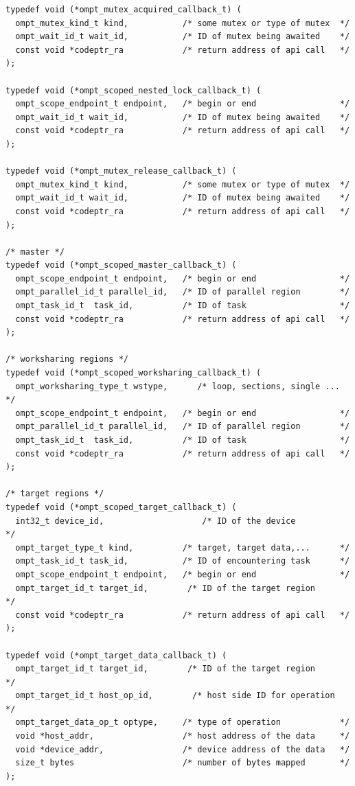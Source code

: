 \documentclass{article}
\begin{document}
{\begin{verbatim}
typedef void (*ompt_mutex_acquired_callback_t) ( 
  ompt_mutex_kind_t kind,           /* some mutex or type of mutex  */ 
  ompt_wait_id_t wait_id,           /* ID of mutex being awaited    */
  const void *codeptr_ra            /* return address of api call   */          
);

typedef void (*ompt_scoped_nested_lock_callback_t) ( 
  ompt_scope_endpoint_t endpoint,   /* begin or end                 */ 
  ompt_wait_id_t wait_id,           /* ID of mutex being awaited    */
  const void *codeptr_ra            /* return address of api call   */          
);

typedef void (*ompt_mutex_release_callback_t) ( 
  ompt_mutex_kind_t kind,           /* some mutex or type of mutex  */
  ompt_wait_id_t wait_id,           /* ID of mutex being awaited    */
  const void *codeptr_ra            /* return address of api call   */       
);

/* master */
typedef void (*ompt_scoped_master_callback_t) ( 
  ompt_scope_endpoint_t endpoint,   /* begin or end                 */ 			   
  ompt_parallel_id_t parallel_id,   /* ID of parallel region        */
  ompt_task_id_t  task_id,          /* ID of task                   */
  const void *codeptr_ra            /* return address of api call   */
);

/* worksharing regions */								    
typedef void (*ompt_scoped_worksharing_callback_t) (
  ompt_worksharing_type_t wstype,	   /* loop, sections, single ...   */	
  ompt_scope_endpoint_t endpoint,   /* begin or end                 */ 		   
  ompt_parallel_id_t parallel_id,   /* ID of parallel region        */
  ompt_task_id_t  task_id,          /* ID of task                   */
  const void *codeptr_ra            /* return address of api call   */
);							    

/* target regions */
typedef void (*ompt_scoped_target_callback_t) ( 
  int32_t device_id,                    /* ID of the device             */
  ompt_target_type_t kind,          /* target, target data,...      */
  ompt_task_id_t task_id,           /* ID of encountering task      */     
  ompt_scope_endpoint_t endpoint,   /* begin or end                 */ 
  ompt_target_id_t target_id, 	     /* ID of the target region      */
  const void *codeptr_ra            /* return address of api call   */
);

typedef void (*ompt_target_data_callback_t) (
  ompt_target_id_t target_id, 	     /* ID of the target region      */
  ompt_target_id_t host_op_id,	      /* host side ID for operation   */
  ompt_target_data_op_t optype,     /* type of operation            */
  void *host_addr,                  /* host address of the data     */
  void *device_addr,                /* device address of the data   */ 
  size_t bytes                      /* number of bytes mapped       */		
);


\end{verbatim}}
\end{document}
